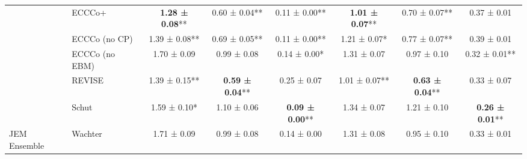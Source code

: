 \begin{table*}
{\begin{tabular}[t]{llcccccc}
 & ECCCo+ & \textbf{1.28 ± 0.08}** & 0.60 ± 0.04** & 0.11 ± 0.00** & \textbf{1.01 ± 0.07}** & 0.70 ± 0.07** & 0.37 ± 0.01\hphantom{*}\hphantom{*}\\

 & ECCCo (no CP) & 1.39 ± 0.08** & 0.69 ± 0.05** & 0.11 ± 0.00** & 1.21 ± 0.07*\hphantom{*} & 0.77 ± 0.07** & 0.39 ± 0.01\hphantom{*}\hphantom{*}\\

 & ECCCo (no EBM) & 1.70 ± 0.09\hphantom{*}\hphantom{*} & 0.99 ± 0.08\hphantom{*}\hphantom{*} & 0.14 ± 0.00*\hphantom{*} & 1.31 ± 0.07\hphantom{*}\hphantom{*} & 0.97 ± 0.10\hphantom{*}\hphantom{*} & 0.32 ± 0.01**\\

 & REVISE & 1.39 ± 0.15** & \textbf{0.59 ± 0.04}** & 0.25 ± 0.07\hphantom{*}\hphantom{*} & 1.01 ± 0.07** & \textbf{0.63 ± 0.04}** & 0.33 ± 0.07\hphantom{*}\hphantom{*}\\

 & Schut & 1.59 ± 0.10*\hphantom{*} & 1.10 ± 0.06\hphantom{*}\hphantom{*} & \textbf{0.09 ± 0.00}** & 1.34 ± 0.07\hphantom{*}\hphantom{*} & 1.21 ± 0.10\hphantom{*}\hphantom{*} & \textbf{0.26 ± 0.01}**\\

\multirow{-7}{*}{\raggedright\arraybackslash JEM Ensemble} & Wachter & 1.71 ± 0.09\hphantom{*}\hphantom{*} & 0.99 ± 0.08\hphantom{*}\hphantom{*} & 0.14 ± 0.00\hphantom{*}\hphantom{*} & 1.31 ± 0.08\hphantom{*}\hphantom{*} & 0.95 ± 0.10\hphantom{*}\hphantom{*} & 0.33 ± 0.01\hphantom{*}\hphantom{*}\\
\bottomrule
\end{tabular}}
\end{table*}
